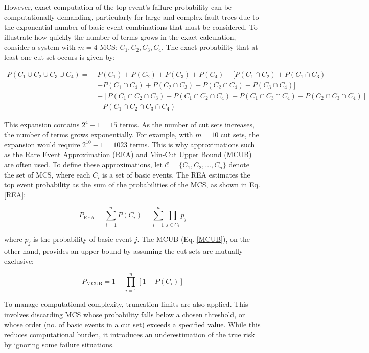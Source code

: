 However, exact computation of the top event's failure probability can be computationally demanding, particularly for large and complex fault trees due to the exponential number of basic event combinations that must be considered. To illustrate how quickly the number of terms grows in the exact calculation, consider a system with $m=4$ MCS: $C_1, C_2, C_3, C_4$. The exact probability that at least one cut set occurs is given by:

\begin{align*}
P(C_1 \cup C_2 \cup C_3 \cup C_4) =\;&
P(C_1) + P(C_2) + P(C_3) + P(C_4) - [P(C_1 \cap C_2) + P(C_1 \cap C_3)\\
&+ P(C_1 \cap C_4) + P(C_2 \cap C_3) + P(C_2 \cap C_4) + P(C_3 \cap C_4)] \\
&+ [P(C_1 \cap C_2 \cap C_3) + P(C_1 \cap C_2 \cap C_4) + P(C_1 \cap C_3 \cap C_4) + P(C_2 \cap C_3 \cap C_4)] \\
&- P(C_1 \cap C_2 \cap C_3 \cap C_4)
\end{align*}

This expansion contains $2^4 - 1 = 15$ terms. As the number of cut sets increases, the number of terms grows exponentially. For example, with $m=10$ cut sets, the expansion would require $2^{10} - 1 = 1023$ terms. This is why approximations such as the Rare Event Approximation (REA) and Min-Cut Upper Bound (MCUB) are often used. To define these approximations, let \(\mathcal{C} = \{C_1, C_2, \ldots, C_n\}\) denote the set of MCS, where each \(C_i\) is a set of basic events. The REA estimates the top event probability as the sum of the probabilities of the MCS, as shown in Eq. \ref{REA}:

\begin{equation}
\label{REA}
P_{\mathrm{REA}} = \sum_{i=1}^n P(C_i) = \sum_{i=1}^n \prod_{j \in C_i}p_j \end{equation}

where \(p_j\) is the probability of basic event \(j\). The MCUB (Eq. \ref{MCUB}), on the other hand, provides an upper bound by assuming the cut sets are mutually exclusive:

\begin{equation}
\label{MCUB}
P_{\mathrm{MCUB}} = 1 - \prod_{i=1}^n \left[1 - P(C_i)\right]
\end{equation}

To manage computational complexity, truncation limits are also applied. This involves discarding MCS whose probability falls below a chosen threshold, or whose order (no. of basic events in a cut set) exceeds a specified value. While this reduces computational burden, it introduces an underestimation of the true risk by ignoring some failure situations. 


